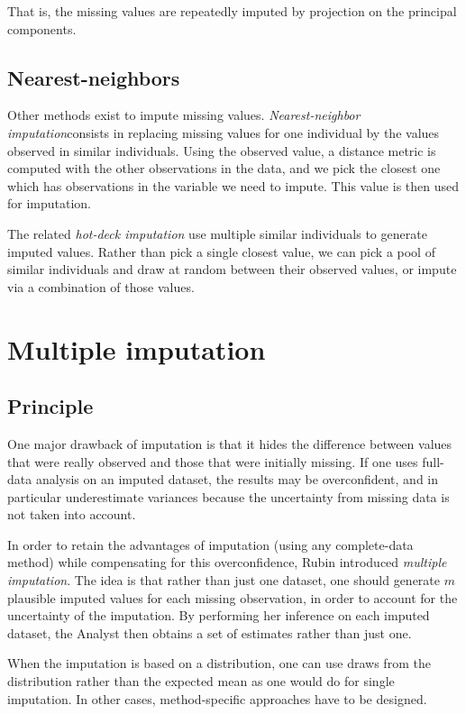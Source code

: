That is, the missing values are repeatedly imputed by projection on the principal components. 
		
		\subsection{Nearest-neighbors}
Other methods exist to impute missing values. \emph{Nearest-neighbor imputation}\cite{chen2000nearest}consists in replacing missing values for one individual by the values observed in similar individuals. Using the observed value, a distance metric is computed with the other observations in the data, and we pick the closest one which has observations in the variable we need to impute. This value is then used for imputation.

 The related \emph{hot-deck imputation} \cite{andridge2010hotdeck} use multiple similar individuals to generate imputed values. Rather than pick a single closest value, we can pick a pool of similar individuals and draw at random between their observed values, or impute via a combination of those values.

	\section{Multiple imputation}
		\subsection{Principle}
One major drawback of imputation is that it hides the difference between values that were really observed and those that were initially missing. If one uses full-data analysis on an imputed dataset, the results may be overconfident, and in particular underestimate variances because the uncertainty from missing data is not taken into account.

In order to retain the advantages of imputation (using any complete-data method) while compensating for this overconfidence, Rubin \cite{rubin1986mi_founding} introduced \emph{multiple imputation}. The idea is that rather than just one dataset, one should generate $m$ plausible imputed values for each missing observation, in order to account for the uncertainty of the imputation. By performing her inference on each imputed dataset, the Analyst then obtains a set of estimates rather than just one. 

When the imputation is based on a distribution, one can use draws from the distribution rather than the expected mean as one would do for single imputation. In other cases, method-specific approaches have to be designed.

